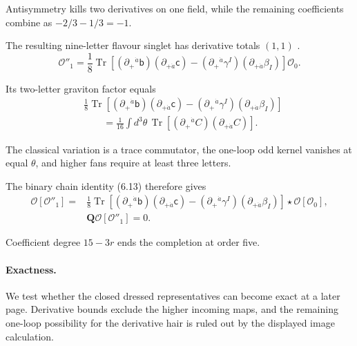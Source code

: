 \documentclass[11pt]{article}
\numberwithin{equation}{section}
\numberwithin{figure}{section}
\numberwithin{table}{section}
\begin{document}
\begin{proofbox}
Antisymmetry kills two derivatives on one field, while the remaining coefficients combine as $-2/3-1/3=-1$.

The resulting nine-letter flavour singlet has derivative totals $(1,1)$ \cite[Eq. (3.5)]{KKLP}.
\begin{equation}\label{eq-hair-derivative}
\mathcal O''_1=\frac18\operatorname{Tr}\!\left[
(\partial_+{}^{\dot a}\mathsf b)(\partial_{+\dot a}\mathsf c)
-(\partial_+{}^{\dot a}\gamma^I)(\partial_{+\dot a}\beta_I)
\right]\mathcal O_0.
\end{equation}

Its two-letter graviton factor equals
\begin{equation}\label{eq-hair-factor-superfield}
\begin{aligned}
&\frac18\operatorname{Tr}\!\left[
(\partial_+{}^{\dot a}\mathsf b)(\partial_{+\dot a}\mathsf c)
-(\partial_+{}^{\dot a}\gamma^I)(\partial_{+\dot a}\beta_I)
\right]\\
&\qquad=\frac1{16}\int d^3\theta\,
\operatorname{Tr}\!\left[(\partial_+{}^{\dot a}C)
(\partial_{+\dot a}C)\right].
\end{aligned}
\end{equation}

The classical variation is a trace commutator, the one-loop odd kernel vanishes at equal $\theta$, and higher fans require at least three letters.

The binary chain identity (6.13) therefore gives
\begin{equation}\label{eq-hair-derivative-completion}
\begin{aligned}
\mathcal O[\mathcal O''_1]
={}&\frac18\operatorname{Tr}\!\left[
(\partial_+{}^{\dot a}\mathsf b)(\partial_{+\dot a}\mathsf c)
-(\partial_+{}^{\dot a}\gamma^I)(\partial_{+\dot a}\beta_I)
\right]\star\mathcal O[\mathcal O_0],\\
&\mathbf Q\mathcal O[\mathcal O''_1]=0.
\end{aligned}
\end{equation}

Coefficient degree $15-3r$ ends the completion at order five.

\paragraph{Exactness.}\label{exactness}

We test whether the closed dressed representatives can become exact at a later page. Derivative bounds exclude the higher incoming maps, and the remaining one-loop possibility for the derivative hair is ruled out by the displayed image calculation.


\end{proofbox}
\end{document}
